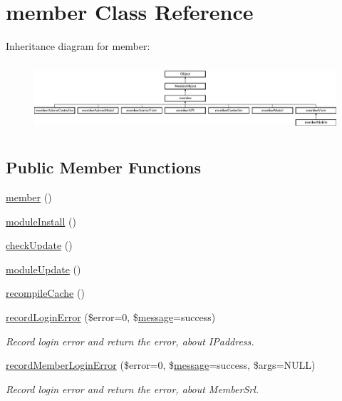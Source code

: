 \hypertarget{classmember}{}\section{member Class Reference}
\label{classmember}
Inheritance diagram for member\+:\begin{figure}[H]
\begin{center}
\leavevmode
\includegraphics[height=2.580645cm]{classmember}
\end{center}
\end{figure}
\subsection*{Public Member Functions}
\begin{DoxyCompactItemize}
\item 
\hyperlink{classmember_a4153f13605eac8adf8dde89ee7d18c02}{member} ()
\item 
\hyperlink{classmember_a5834fa338d03eedcb5e84bb8ccac305b}{module\+Install} ()
\item 
\hyperlink{classmember_ad28f96bfab17efa94a9f2607a8b42a3d}{check\+Update} ()
\item 
\hyperlink{classmember_a72b7382e568644ccadb69b67e4504086}{module\+Update} ()
\item 
\hyperlink{classmember_ab5bc32f3821f7cba98e34703679c69ee}{recompile\+Cache} ()
\item 
\hyperlink{classmember_ac7aa72e76a771976a3aaae4baf31477d}{record\+Login\+Error} (\$error=0, \$\hyperlink{classmessage}{message}=\textquotesingle{}success\textquotesingle{})
\begin{DoxyCompactList}\small\item\em Record login error and return the error, about I\+Paddress. \end{DoxyCompactList}\item 
\hyperlink{classmember_ad43b5bae89e7d46d2498f853c10414cb}{record\+Member\+Login\+Error} (\$error=0, \$\hyperlink{classmessage}{message}=\textquotesingle{}success\textquotesingle{}, \$args=N\+U\+LL)
\begin{DoxyCompactList}\small\item\em Record login error and return the error, about Member\+Srl. \end{DoxyCompactList}\end{DoxyCompactItemize}
